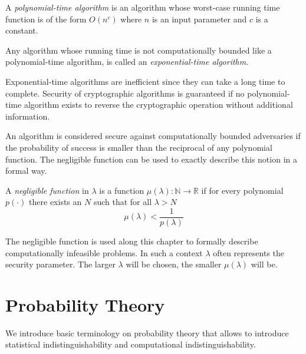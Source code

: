 \begin{defn}
\label{def:pt_algorithm}
 A \textit{polynomial-time algorithm} is an algorithm whose worst-case running time function is of the form $O \left( n^c\right)$ where $n$ is an input parameter and $c$ is a constant.
\end{defn}

\begin{defn}
\label{def:pt_algorithm}
 Any algorithm whose running time is not computationally bounded like a polynomial-time algorithm, is called an \textit{exponential-time algorithm}.
\end{defn}

Exponential-time algorithms are inefficient since they can take a long time to complete. Security of cryptographic algorithms is guaranteed if no polynomial-time algorithm exists to reverse the cryptographic operation without additional information.

An algorithm is considered secure against computationally bounded adversaries if the probability of success is smaller than the reciprocal of any polynomial function. The negligible function can be used to exactly describe this notion in a formal way.

\begin{defn}
\label{def:negligible_function}
A \textit{negligible function} in $\lambda$ is a function $\mu \left( \lambda \right): \mathbb{N} \rightarrow \mathbb{R}$ if for every polynomial $p \left( \cdot \right)$ there exists an $N$ such that for all $\lambda > N$~\cite{book:Goldreich97}
 \begin{equation*}
  \mu \left( \lambda \right) < \frac{1}{p\left( \lambda \right)} 
 \end{equation*}
\end{defn}

The negligible function is used along this chapter to formally describe computationally infeasible problems. In such a context $\lambda$ often represents the security parameter. The larger $\lambda$ will be chosen, the smaller $\mu \left( \lambda \right)$ will be.

\section{Probability Theory}
We introduce basic terminology on probability theory that allows to introduce statistical indistinguishability and computational indistinguishability.

